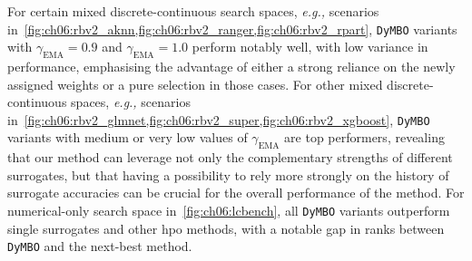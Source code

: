 For certain mixed discrete-continuous search spaces, \emph{e.g.,} scenarios in~\cref{fig:ch06:rbv2_aknn,fig:ch06:rbv2_ranger,fig:ch06:rbv2_rpart}, \texttt{DyMBO} variants with $\gamma_{\mathrm{EMA}} = 0.9$ and $\gamma_{\mathrm{EMA}} = 1.0$ perform notably well, with low variance in performance, emphasising the advantage of either a strong reliance on the newly assigned weights or a pure selection in those cases.
For other mixed discrete-continuous spaces, \emph{e.g.,} scenarios in~\cref{fig:ch06:rbv2_glmnet,fig:ch06:rbv2_super,fig:ch06:rbv2_xgboost}, \texttt{DyMBO} variants with medium or very low values of $\gamma_{\mathrm{EMA}}$ are top performers, revealing that our method can leverage not only the complementary strengths of different surrogates, but that having a possibility to rely more strongly on the history of surrogate accuracies can be crucial for the overall performance of the method.
For numerical-only search space in~\cref{fig:ch06:lcbench}, all \texttt{DyMBO} variants outperform single surrogates and other \gls{hpo} methods, with a notable gap in ranks between \texttt{DyMBO} and the next-best method.

